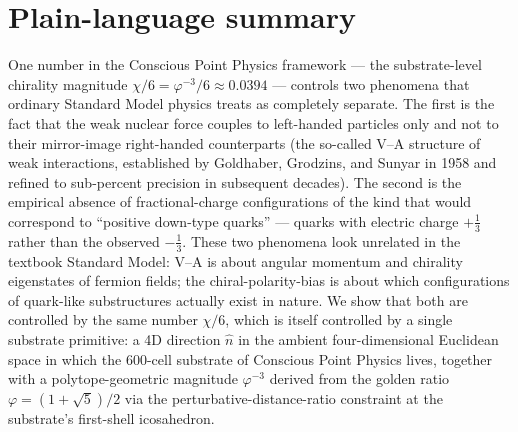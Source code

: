 \documentclass[11pt,letterpaper]{article}
\begin{document}
\section*{Plain-language summary}

One number in the Conscious Point Physics framework --- the substrate-level chirality magnitude $\chi/6 = \varphi^{-3}/6 \approx 0.0394$ --- controls two phenomena that ordinary Standard Model physics treats as completely separate. The first is the fact that the weak nuclear force couples to left-handed particles only and not to their mirror-image right-handed counterparts (the so-called V--A structure of weak interactions, established by Goldhaber, Grodzins, and Sunyar in 1958 and refined to sub-percent precision in subsequent decades). The second is the empirical absence of fractional-charge configurations of the kind that would correspond to ``positive down-type quarks'' --- quarks with electric charge $+\frac{1}{3}$ rather than the observed $-\frac{1}{3}$. These two phenomena look unrelated in the textbook Standard Model: V--A is about angular momentum and chirality eigenstates of fermion fields; the chiral-polarity-bias is about which configurations of quark-like substructures actually exist in nature. We show that both are controlled by the same number $\chi/6$, which is itself controlled by a single substrate primitive: a 4D direction $\hat{n}$ in the ambient four-dimensional Euclidean space in which the 600-cell substrate of Conscious Point Physics lives, together with a polytope-geometric magnitude $\varphi^{-3}$ derived from the golden ratio $\varphi = (1+\sqrt{5})/2$ via the perturbative-distance-ratio constraint at the substrate's first-shell icosahedron.
\end{document}
